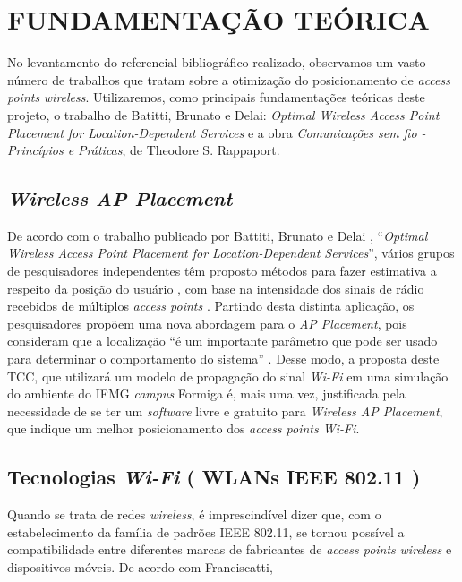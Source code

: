 \documentclass[
	12pt,				%
	twoside,			%
	a4paper,			%
	english,			%
	french,				%
	spanish,			%
	brazil				%
	]{abntex2}
\begin{document}
\chapter{FUNDAMENTAÇÃO TEÓRICA}\label{sec:fundamentacao}

No levantamento do referencial bibliográfico realizado, observamos um
vasto número de trabalhos que tratam sobre a otimização do
posicionamento de \emph{access points} \emph{wireless}. Utilizaremos,
como principais fundamentações teóricas deste projeto, o trabalho de
Batitti, Brunato e Delai: \emph{Optimal Wireless Access Point Placement
for Location-Dependent Services} e a obra \emph{Comunicações sem fio -
Princípios e Práticas}, de Theodore S. Rappaport.

\section{\texorpdfstring{\emph{Wireless AP
Placement}}{Wireless AP Placement}}\label{wireless-ap-placement}

De acordo com o trabalho publicado por Battiti, Brunato e Delai
\cite{BATTITI}, ``\emph{Optimal Wireless Access Point Placement for
Location-Dependent Services}'', vários grupos de pesquisadores
independentes têm proposto métodos para fazer estimativa a respeito da
posição do usuário \cite{DALSSOTO}, com base na intensidade dos sinais
de rádio recebidos de múltiplos \emph{access points} \cite{NAJNUDEL}.
Partindo desta distinta aplicação, os pesquisadores propõem uma nova
abordagem para o \emph{AP Placement}, pois consideram que a localização
``é um importante parâmetro que pode ser usado para determinar o
comportamento do sistema'' \cite[p. 1]{BATTITI}. Desse modo, a proposta
deste TCC, que utilizará um modelo de propagação do sinal \emph{Wi-Fi}
em uma simulação do ambiente do IFMG \emph{campus} Formiga é, mais uma
vez, justificada pela necessidade de se ter um \emph{software} livre e
gratuito para \emph{Wireless AP Placement}, que indique um melhor
posicionamento dos \emph{access points Wi-Fi}.

\section{\texorpdfstring{Tecnologias \emph{Wi-Fi} ( WLANs IEEE 802.11
)}{Tecnologias Wi-Fi ( WLANs IEEE 802.11 )}}\label{tecnologias-wi-fi-wlans-ieee-802.11}

Quando se trata de redes \emph{wireless}, é imprescindível dizer que,
com o estabelecimento da família de padrões IEEE 802.11, se tornou
possível a compatibilidade entre diferentes marcas de fabricantes de
\emph{access points} \emph{wireless} e dispositivos móveis. De acordo
com Franciscatti,
\end{document}
